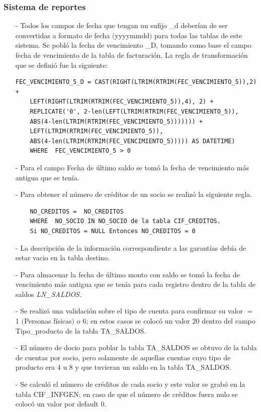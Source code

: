 \documentclass[a4paper,openright,12pt]{book}
\begin{document}
\subsubsection{Sistema de reportes}
\begin{itemize}
\item[-] Todos los campos de fecha que tengan un sufijo \_d deber\'ian de ser convertidas a formato de fecha $($yyyymmdd$)$ para todas las tablas de este sistema. Se pobl\'o la fecha de vencimiento \_D, tomando como base el campo fecha de vencimiento de la tabla de facturaci\'on. La regla de transformaci\'on que se defini\'o fue la siguiente:
\begin{verbatim}
FEC_VENCIMIENTO_5_D = CAST(RIGHT(LTRIM(RTRIM(FEC_VENCIMIENTO_5)),2) +
	LEFT(RIGHT(LTRIM(RTRIM(FEC_VENCIMIENTO_5)),4), 2) +  
	REPLICATE('0', 2-len(LEFT(LTRIM(RTRIM(FEC_VENCIMIENTO_5)), 
	ABS(4-len(LTRIM(RTRIM(FEC_VENCIMIENTO_5))))))) +
	LEFT(LTRIM(RTRIM(FEC_VENCIMIENTO_5)), 
	ABS(4-len(LTRIM(RTRIM(FEC_VENCIMIENTO_5))))) AS DATETIME)     
	WHERE  FEC_VENCIMIENTO_5 > 0
\end{verbatim}
\item[-] Para el campo Fecha de último saldo se tom\'o la fecha de vencimiento m\'as antigua que se ten\'ia.
\item[-] Para obtener el n\'umero de cr\'editos de un socio se realiz\'o la siguiente regla.
\begin{verbatim}
	NO_CREDITOS =  NO_CREDITOS 
	WHERE  NO_SOCIO IN NO_SOCIO de la tabla CIF_CREDITOS.
	Si NO_CREDITOS = NULL Entonces NO_CREDITOS = 0
\end{verbatim} 
\item[-] La descripci\'on de la informaci\'on correspondiente a las garant\'ias deb\'ia de estar vacio en la tabla destino.
\item[-] Para almacenar la fecha de \'ultimo monto con saldo se tom\'o la fecha de vencimiento m\'as antigua que se ten\'ia para cada registro dentro de la tabla de saldos \textit{LN\_SALDOS.}
\item[-] Se realiz\'o una validaci\'on sobre el tipo de cuenta para confirmar su valor $=$ 1 $($Personas f\'isicas$)$ o 6; en estos casos se coloc\'o un valor 20 dentro del campo Tipo\_producto de la tabla TA\_SALDOS.
\item[-] El n\'umero de docio para poblar la tabla TA\_SALDOS se obtuvo de la tabla de cuentas por socio, pero solamente de aquellas cuentas cuyo tipo de producto era 4 u 8 y que tuvieran un saldo en la tabla TA\_SALDOS.
\item[-] Se calcul\'o el n\'umero de cr\'editos de cada socio y este valor se grab\'o en la tabla CIF\_INFGEN; en caso de que el n\'umero de cr\'editos fuera nulo se coloc\'o un valor por default 0.

\end{itemize}
\end{document}
